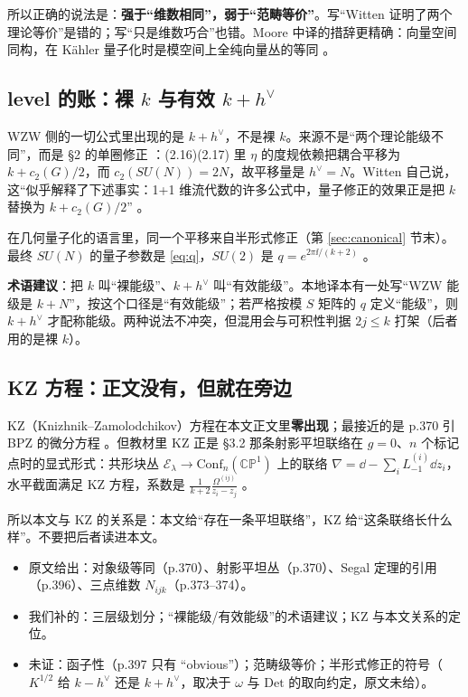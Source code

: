 所以正确的说法是：\textbf{强于“维数相同”，弱于“范畴等价”}。写“Witten 证明了两个理论等价”是错的；写“只是维数巧合”也错。Moore 中译的措辞更精确：向量空间同构，在 K\"ahler 量子化时是模空间上全纯向量丛的等同 。

\subsection{level 的账：裸 $k$ 与有效 $k+h^\vee$}

WZW 侧的一切公式里出现的是 $k+h^\vee$，不是裸 $k$。来源不是“两个理论能级不同”，而是 \S2 的单圈修正 ：(2.16)(2.17) 里 $\eta$ 的度规依赖把耦合平移为 $k+c_2(G)/2$，而 $c_2(SU(N))=2N$，故平移量是 $h^\vee=N$。Witten 自己说，这“似乎解释了下述事实：1+1 维流代数的许多公式中，量子修正的效果正是把 $k$ 替换为 $k+c_2(G)/2$” 。

在几何量子化的语言里，同一个平移来自半形式修正（第 \ref{sec:canonical} 节末）。最终 $SU(N)$ 的量子参数是 \eqref{eq:q}，$SU(2)$ 是 $q=e^{2\pi\ii/(k+2)}$ 。

\begin{keypoint}
\textbf{术语建议}：把 $k$ 叫“裸能级”、$k+h^\vee$ 叫“有效能级”。本地译本有一处写“WZW 能级是 $k+N$”，按这个口径是“有效能级”；若严格按模 $S$ 矩阵的 $q$ 定义“能级”，则 $k+h^\vee$ 才配称能级。两种说法不冲突，但混用会与可积性判据 $2j\le k$ 打架（后者用的是裸 $k$）。
\end{keypoint}

\subsection{KZ 方程：正文没有，但就在旁边}

KZ（Knizhnik--Zamolodchikov）方程在本文正文里\textbf{零出现}；最接近的是 p.370 引 BPZ 的微分方程 。但教材里 KZ 正是 §3.2 那条射影平坦联络在 $g=0$、$n$ 个标记点时的显式形式：共形块丛 $\mathcal{E}_\lambda\to\mathrm{Conf}_n(\mathbb{CP}^1)$ 上的联络 $\nabla=\dd-\sum_i L^{(i)}_{-1}\dd z_i$，水平截面满足 KZ 方程，系数是 $\frac{1}{k+2}\frac{\Omega^{(ij)}}{z_i-z_j}$ 。

所以本文与 KZ 的关系是：本文给“存在一条平坦联络”，KZ 给“这条联络长什么样”。不要把后者读进本文。

\begin{boundary}
\begin{itemize}[leftmargin=1.4em]
\item 原文给出：对象级等同（p.370）、射影平坦丛（p.370）、Segal 定理的引用（p.396）、三点维数 $N_{ijk}$（p.373--374）。
\item 我们补的：三层级划分；“裸能级/有效能级”的术语建议；KZ 与本文关系的定位。
\item 未证：函子性（p.397 只有 “obvious”）；范畴级等价；半形式修正的符号（$K^{1/2}$ 给 $k-h^\vee$ 还是 $k+h^\vee$，取决于 $\omega$ 与 $\mathrm{Det}$ 的取向约定，原文未给）。
\end{itemize}
\end{boundary}
